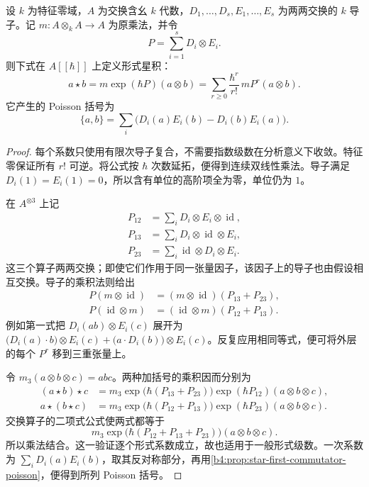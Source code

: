 \begin{proposition}\label{b4:prop:commuting-derivation-star-product}
	设 \(k\) 为特征零域，\(A\) 为交换含幺 \(k\) 代数，\(D_1,\ldots,D_s,E_1,\ldots,E_s\) 为两两交换的 \(k\) 导子。记 \(m:A\otimes_kA\to A\) 为原乘法，并令
	\[
		P=\sum_{i=1}^s D_i\otimes E_i.
	\]
	则下式在 \(A[\![\hbar]\!]\) 上定义形式星积：
	\[
		a\star b=m\exp(\hbar P)(a\otimes b)
		=\sum_{r\ge0}\frac{\hbar^r}{r!}\,mP^r(a\otimes b).
	\]
	它产生的 Poisson 括号为
	\[
		\{a,b\}=\sum_i\bigl(D_i(a)E_i(b)-D_i(b)E_i(a)\bigr).
	\]
\end{proposition}
\begin{proof}
	每个系数只使用有限次导子复合，不需要指数级数在分析意义下收敛。特征零保证所有 \(r!\) 可逆。将公式按 \(\hbar\) 次数延拓，便得到连续双线性乘法。导子满足 \(D_i(1)=E_i(1)=0\)，所以含有单位的高阶项全为零，单位仍为 \(1\)。

	在 \(A^{\otimes3}\) 上记
	\[
		\begin{aligned}
			P_{12}&=\sum_i D_i\otimes E_i\otimes\operatorname{id},\\
			P_{13}&=\sum_i D_i\otimes\operatorname{id}\otimes E_i,\\
			P_{23}&=\sum_i\operatorname{id}\otimes D_i\otimes E_i.
		\end{aligned}
	\]
	这三个算子两两交换；即使它们作用于同一张量因子，该因子上的导子也由假设相互交换。导子的乘积法则给出
	\[
		\begin{aligned}
			P(m\otimes\operatorname{id})
			&=(m\otimes\operatorname{id})(P_{13}+P_{23}),\\
			P(\operatorname{id}\otimes m)
			&=(\operatorname{id}\otimes m)(P_{12}+P_{13}).
		\end{aligned}
	\]
	例如第一式把 \(D_i(ab)\otimes E_i(c)\) 展开为 \(\bigl(D_i(a)\cdot b\bigr)\otimes E_i(c)+\bigl(a\cdot D_i(b)\bigr)\otimes E_i(c)\)。反复应用相同等式，便可将外层的每个 \(P^r\) 移到三重张量上。

	令 \(m_3(a\otimes b\otimes c)=abc\)。两种加括号的乘积因而分别为
	\[
		\begin{aligned}
			(a\star b)\star c
			&=m_3\exp\bigl(\hbar(P_{13}+P_{23})\bigr)
			\exp(\hbar P_{12})(a\otimes b\otimes c),\\
			a\star(b\star c)
			&=m_3\exp\bigl(\hbar(P_{12}+P_{13})\bigr)
			\exp(\hbar P_{23})(a\otimes b\otimes c).
		\end{aligned}
	\]
	交换算子的二项式公式使两式都等于
	\[
		m_3\exp\bigl(\hbar(P_{12}+P_{13}+P_{23})\bigr)(a\otimes b\otimes c).
	\]
	所以乘法结合。这一验证逐个形式系数成立，故也适用于一般形式级数。一次系数为 \(\sum_iD_i(a)E_i(b)\)，取其反对称部分，再用\cref{b4:prop:star-first-commutator-poisson}，便得到所列 Poisson 括号。
\end{proof}

